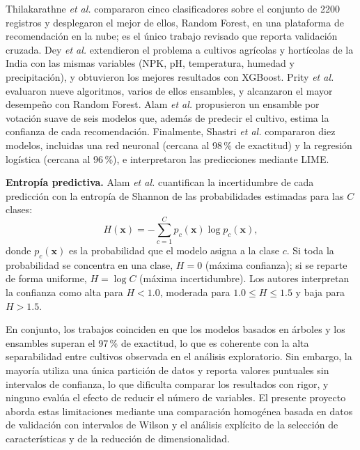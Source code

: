 \documentclass[conference]{IEEEtran}
\begin{document}
Thilakarathne \emph{et al.} \cite{thilakarathne2022} compararon cinco clasificadores sobre el conjunto de 2200 registros y desplegaron el mejor de ellos, Random Forest, en una plataforma de recomendación en la nube; es el único trabajo revisado que reporta validación cruzada. Dey \emph{et al.} \cite{dey2024} extendieron el problema a cultivos agrícolas y hortícolas de la India con las mismas variables (NPK, pH, temperatura, humedad y precipitación), y obtuvieron los mejores resultados con XGBoost. Prity \emph{et al.} \cite{prity2024} evaluaron nueve algoritmos, varios de ellos ensambles, y alcanzaron el mayor desempeño con Random Forest. Alam \emph{et al.} \cite{alam2025} propusieron un ensamble por votación suave de seis modelos que, además de predecir el cultivo, estima la confianza de cada recomendación. Finalmente, Shastri \emph{et al.} \cite{shastri2025} compararon diez modelos, incluidas una red neuronal (cercana al 98\,\% de exactitud) y la regresión logística (cercana al 96\,\%), e interpretaron las predicciones mediante LIME.

\textbf{Entropía predictiva.} Alam \emph{et al.} \cite{alam2025} cuantifican la incertidumbre de cada predicción con la entropía de Shannon de las probabilidades estimadas para las $C$ clases:
\begin{equation}
H(\mathbf{x})=-\sum_{c=1}^{C} p_c(\mathbf{x})\log p_c(\mathbf{x}),
\end{equation}
donde $p_c(\mathbf{x})$ es la probabilidad que el modelo asigna a la clase $c$. Si toda la probabilidad se concentra en una clase, $H=0$ (máxima confianza); si se reparte de forma uniforme, $H=\log C$ (máxima incertidumbre). Los autores interpretan la confianza como alta para $H<1.0$, moderada para $1.0\le H\le1.5$ y baja para $H>1.5$.

En conjunto, los trabajos coinciden en que los modelos basados en árboles y los ensambles superan el 97\,\% de exactitud, lo que es coherente con la alta separabilidad entre cultivos observada en el análisis exploratorio. Sin embargo, la mayoría utiliza una única partición de datos y reporta valores puntuales sin intervalos de confianza, lo que dificulta comparar los resultados con rigor, y ninguno evalúa el efecto de reducir el número de variables. El presente proyecto aborda estas limitaciones mediante una comparación homogénea basada en datos de validación con intervalos de Wilson y el análisis explícito de la selección de características y de la reducción de dimensionalidad.

\end{document}

